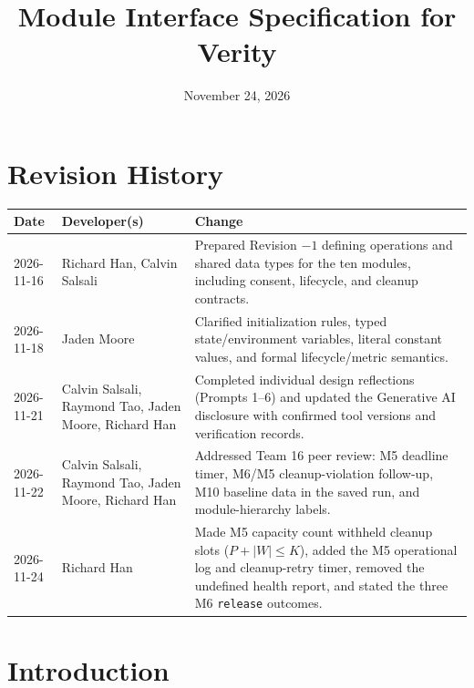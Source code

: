 \documentclass[12pt, titlepage]{article}
\begin{document}
\title{Module Interface Specification for Verity}

\author{\authname}

\date{November 24, 2026}

\maketitle


\section{Revision History}

\begin{tabularx}{\textwidth}{p{2.3cm}p{3.2cm}X}
\toprule {\bf Date} & {\bf Developer(s)} & {\bf Change}\\
\midrule
2026-11-16 & Richard Han, Calvin Salsali & Prepared Revision $-1$ defining operations and shared data types for the ten modules, including consent, lifecycle, and cleanup contracts.\\
2026-11-18 & Jaden Moore & Clarified initialization rules, typed state/environment variables, literal constant values, and formal lifecycle/metric semantics.\\
2026-11-21 & Calvin Salsali, Raymond Tao, Jaden Moore, Richard Han & Completed individual design reflections (Prompts 1--6) and updated the Generative AI disclosure with confirmed tool versions and verification records.\\
2026-11-22 & Calvin Salsali, Raymond Tao, Jaden Moore, Richard Han & Addressed Team 16 peer review: M5 deadline timer, M6/M5 cleanup-violation follow-up, M10 baseline data in the saved run, and module-hierarchy labels.\\
2026-11-24 & Richard Han & Made M5 capacity count withheld cleanup slots ($P+|W|\le K$), added the M5 operational log and cleanup-retry timer, removed the undefined health report, and stated the three M6 \texttt{release} outcomes.\\
\bottomrule
\end{tabularx}

\clearpage

\tableofcontents

\listoftables

\clearpage


\section{Introduction}\label{sec:introduction}
\end{document}
